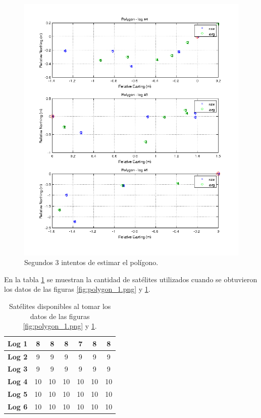 \documentclass[spanish,12pt,a4paper,titlepage]{report}
\begin{document}
\newpage
\begin{figure}[h!]
  \begin{center}
  \includegraphics[width=1.1\textwidth]{./img/polygon_2.png}
  \end{center}
  \caption{Segundos 3 intentos de estimar el polígono.}
  \label{fig:polygon_2.png}
\end{figure}

\newpage
En la tabla \ref{tab:polygon-sat} se muestran la cantidad de satélites utilizados cuando se obtuvieron los datos de las figuras \ref{fig:polygon_1.png} y \ref{fig:polygon_2.png}.

\begin{table}[H]
\begin{center}
\begin{tabular}{|l||c|c|c|c|c|c|}
\hline
\textbf{Log 1} & 8 & 8 & 8 & 7 & 8 & 8 \\
\hline
\textbf{Log 2} & 9 & 9 & 9 & 9 & 9 & 9 \\
\hline
\textbf{Log 3} & 9 & 9 & 9 & 9 & 9 & 9 \\
\hline
\textbf{Log 4} & 10 & 10 & 10 & 10 & 10 & 10 \\
\hline
\textbf{Log 5} & 10 & 10 & 10 & 10 & 10 & 10 \\
\hline
\textbf{Log 6} & 10 & 10 & 10 & 10 & 10 & 10\\
\hline
\end{tabular} 
\caption{Satélites disponibles al tomar los datos de las figuras \ref{fig:polygon_1.png} y \ref{fig:polygon_2.png}.}
\label{tab:polygon-sat}
\end{center}
\end{table}
\end{document}
